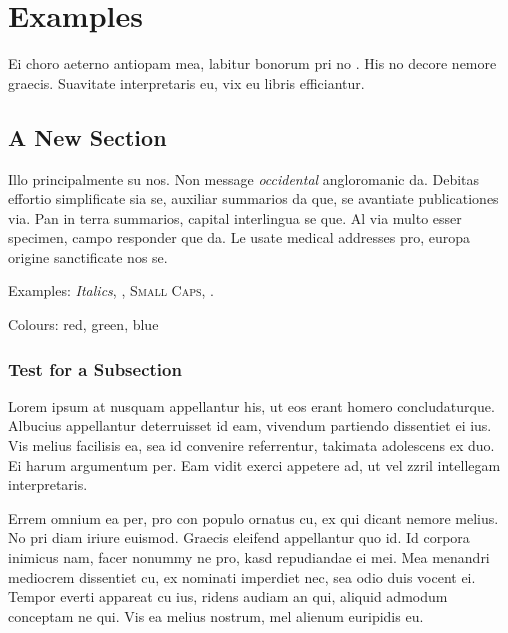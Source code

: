 \chapter{Examples}\label{ch:examples}
Ei choro aeterno antiopam mea, labitur bonorum pri no \cite{gauss}. His no decore nemore graecis. Suavitate interpretaris eu, vix eu libris efficiantur.

\section{A New Section}
Illo principalmente su nos. Non message \emph{occidental} angloromanic da. Debitas effortio simplificate sia se, auxiliar summarios da que, se avantiate publicationes via. Pan in terra summarios, capital interlingua se que. Al via multo esser specimen, campo responder que da. Le usate medical addresses pro, europa origine sanctificate nos se.

Examples: \textit{Italics}, , \textsc{Small Caps}, .

Colours: \textcolor{CTtitle}{red}, \textcolor{CTcitation}{green}, \textcolor{CTlink}{blue}


\subsection{Test for a Subsection}
Lorem ipsum at nusquam appellantur his, ut eos erant homero concludaturque. Albucius appellantur deterruisset id eam, vivendum partiendo dissentiet ei ius. Vis melius facilisis ea, sea id convenire referrentur, takimata adolescens ex duo. Ei harum argumentum per. Eam vidit exerci appetere ad, ut vel zzril intellegam interpretaris.

Errem omnium ea per, pro con populo ornatus cu, ex qui dicant nemore melius. No pri diam iriure euismod. Graecis eleifend appellantur quo id. Id corpora inimicus nam, facer nonummy ne pro, kasd repudiandae ei mei. Mea menandri mediocrem dissentiet cu, ex nominati imperdiet nec, sea odio duis vocent ei. Tempor everti appareat cu ius, ridens audiam an qui, aliquid admodum conceptam ne qui. Vis ea melius nostrum, mel alienum euripidis eu.

